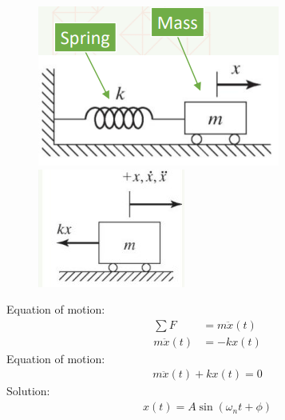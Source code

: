 \documentclass[class=report, crop=false, 12pt,a4paper]{standalone}
\begin{document}
\begin{figure}[H]
    \centering
    \begin{minipage}{.5\textwidth}
      \centering
      \includegraphics[width=.8\linewidth]{../img/diagram1.jpg}
    \end{minipage}%
    \begin{minipage}{.5\textwidth}
      \centering
      \includegraphics[width=.8\linewidth]{../img/diagram2.jpg}
    \end{minipage}
\end{figure}
Equation of motion:
\begin{align}
    \sum F &= m\ddot{x} (t)\\
    m\ddot{x}(t) &= -kx(t)
\end{align}
Equation of motion:
\begin{gather}
    m\ddot{x}(t) + kx(t) = 0
\end{gather}
Solution:
\begin{gather}
    x(t) = A\sin \left(\omega_n t + \phi \right)
\end{gather}
\end{document}
